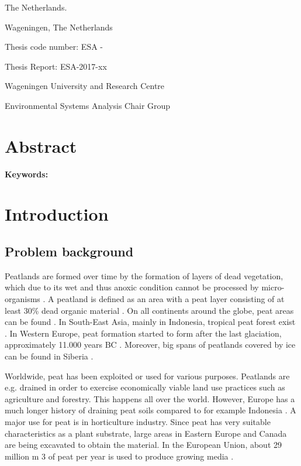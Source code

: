 \documentclass[a4paper,12pt]{scrbook}
\begin{document}
\begin{titlingpage}
\begin{center}
  {The Netherlands.}\vspace{2.7cm}
  \end{center}
  
  \begin{flushright}
    {\thedate}
  
    {Wageningen, The Netherlands}
  \end{flushright}\vspace{0.5cm}

    Thesis code number: ESA -
  
    Thesis Report: ESA-2017-xx
  
    {Wageningen University and Research Centre}
  
    {Environmental Systems Analysis Chair Group}
\end{titlingpage}


\chapter*{Abstract}

\textbf{Keywords:} 

\tableofcontents

\chapter{Introduction}

\section{Problem background}

Peatlands are formed over time by the formation of layers of dead vegetation, which due to its wet and thus anoxic condition cannot be processed by micro-organisms \citep{clymo1984limits}. A peatland is defined as an area with a peat layer consisting of at least 30\% dead organic material \citep{joosten2002wise}. On all continents around the globe, peat areas can be found \citep{joosten2002wise}. In South-East Asia, mainly in Indonesia, tropical peat forest exist \citep{page2011global}. In Western Europe, peat formation started to form after the last glaciation, approximately 11.000 years BC \citep{brouns2016effects}. Moreover, big spans of peatlands covered by ice can be found in Siberia \citep{frey2005amplified}.

Worldwide, peat has been exploited or used for various purposes. Peatlands are e.g. drained in order to exercise economically viable land use practices such as agriculture and forestry. This happens all over the world. However, Europe has a much longer history of draining peat soils compared to for example Indonesia \citep{joosten2002wise}. A major use for peat is in horticulture industry. Since peat has very suitable characteristics as a plant substrate, large areas in Eastern Europe and Canada are being excavated to obtain the material. In the European Union, about 29 million m 3 of peat per year is used to produce growing media \citep{blievernicht2012youngest}.
\end{document}
